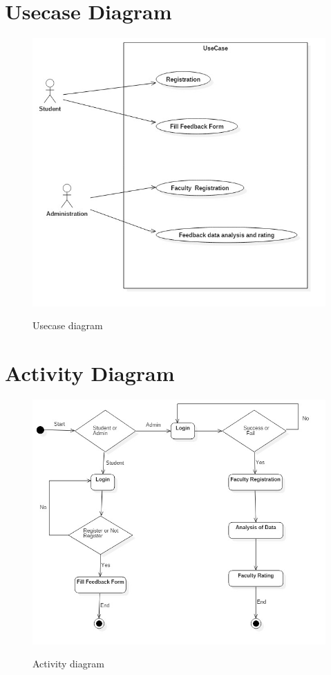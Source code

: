 \documentclass[12 pt,a4paper]{report}
\begin{document}
\section{Usecase Diagram}
\begin{figure}[ht]
\begin{center}
\includegraphics[scale=.5]{UseCaseDiagram1.png}\\
\caption{Usecase diagram}
\end{center}
\end{figure}
\newpage
\section{Activity Diagram}
\begin{figure}[ht]
\begin{center}
\includegraphics[scale=.5]{ActivityDiagram1.png}\\
\caption{Activity diagram}
\end{center}
\end{figure}
\newpage
\end{document}
